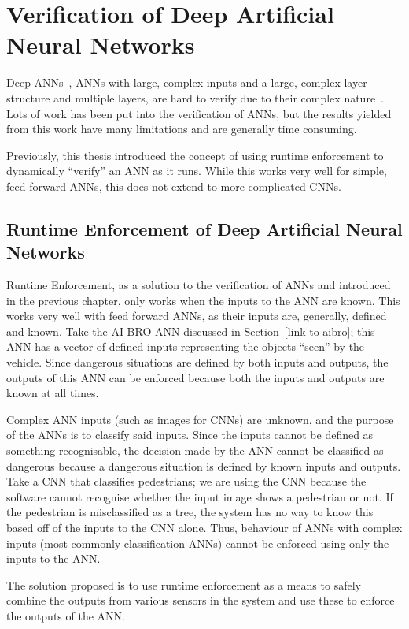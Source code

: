 \section{Verification of Deep Artificial Neural Networks}
Deep \acfp{ANN}~\cite{schmidhuber2015deep}, \acp{ANN} with large, complex inputs and a large, complex layer structure and multiple layers, are hard to verify due to their complex nature~\cite{Gehr2018AI2SA}. 
Lots of work has been put into the verification of \acp{ANN}, but the results yielded from this work have many limitations and are generally time consuming.

Previously, this thesis introduced the concept of using runtime enforcement to dynamically ``verify'' an \ac{ANN} as it runs. 
While this works very well for simple, feed forward \acp{ANN}, this does not extend to more complicated \acp{CNN}.

\subsection{Runtime Enforcement of Deep Artificial Neural Networks}
Runtime Enforcement, as a solution to the verification of \acp{ANN} and introduced in the previous chapter, only works when the inputs to the \ac{ANN} are known.
This works very well with feed forward \acp{ANN}, as their inputs are, generally, defined and known.
Take the AI-BRO \ac{ANN} discussed in Section~\ref{link-to-aibro}; this \ac{ANN} has a vector of defined inputs representing the objects ``seen'' by the vehicle.
Since dangerous situations are defined by both inputs and outputs, the outputs of this \ac{ANN} can be enforced because both the inputs and outputs are known at all times.

Complex \ac{ANN} inputs (such as images for \acp{CNN}) are unknown, and the purpose of the \acp{ANN} is to classify said inputs.
Since the inputs cannot be defined as something recognisable, the decision made by the \ac{ANN} cannot be classified as dangerous because a dangerous situation is defined by known inputs and outputs.
Take a \ac{CNN} that classifies pedestrians; we are using the \ac{CNN} because the software cannot recognise whether the input image shows a pedestrian or not.
If the pedestrian is misclassified as a tree, the system has no way to know this based off of the inputs to the \ac{CNN} alone.
Thus, behaviour of \acp{ANN} with complex inputs (most commonly classification \acp{ANN}) cannot be enforced using only the inputs to the \ac{ANN}.

The solution proposed is to use runtime enforcement as a means to safely combine the outputs from various sensors in the system and use these to enforce the outputs of the \ac{ANN}.


